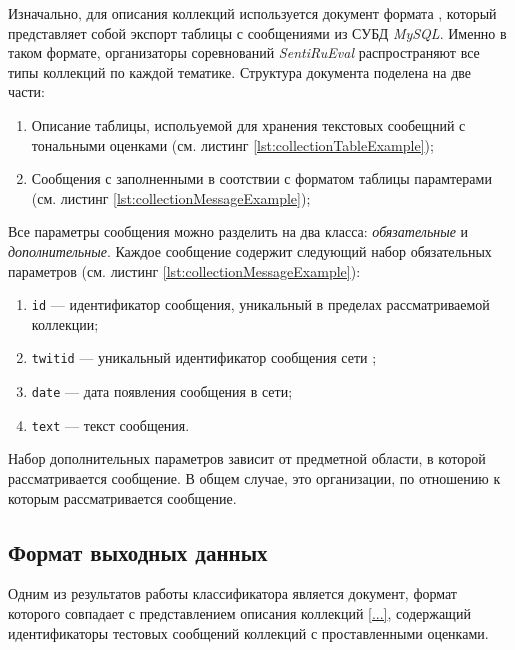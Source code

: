     Изначально, для описания коллекций используется документ формата \xml,
    который представляет собой экспорт таблицы с сообщениями из СУБД {\it MySQL}.
    Именно в таком формате, организаторы соревнований {\it SentiRuEval}
    распространяют все типы коллекций по каждой тематике. Структура документа
    поделена на две части:
    \begin{enumerate}
        \item Описание таблицы, испольуемой для хранения текстовых сообещний с
            тональными оценками (см. листинг \ref{lst:collectionTableExample});
        \item Сообщения с заполненными в соотствии с форматом таблицы
            парамтерами (см. листинг \ref{lst:collectionMessageExample});
    \end{enumerate}

    \newpage
    \lstset{style=xml}
    \newpage
    

    \lstset{style=xml}
    

    Все параметры сообщения можно разделить на два класса: {\it обязательные} и
    {\it дополнительные}. Каждое сообщение содержит следующий набор
    обязательных параметров (см. листинг \ref{lst:collectionMessageExample}):
    \begin{enumerate}
        \item {\tt id} --- идентификатор сообщения, уникальный в пределах рассматриваемой коллекции;
        \item {\tt twitid} --- уникальный идентификатор сообщения сети \twitter;
        \item {\tt date} --- дата появления сообщения в сети;
        \item {\tt text} --- текст сообщения.
    \end{enumerate}

    Набор дополнительных параметров зависит от предметной области, в которой
    рассматривается сообщение. В общем случае, это организации, по отношению к
    которым рассматривается сообщение.

    \subsection{Формат выходных данных}
    Одним из результатов работы классификатора является \xml
    документ, формат которого совпадает с представлением описания коллекций \ref{...},
    содержащий идентификаторы тестовых сообщений коллекций с проставленными оценками.

